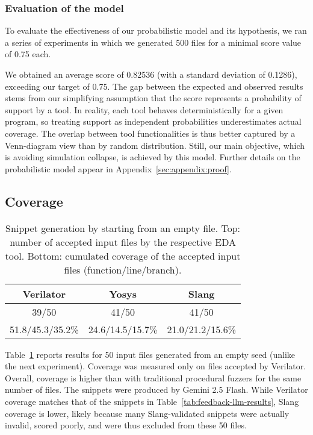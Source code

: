 \subsubsection{Evaluation of the model}
\label{sec:eval:disparities-evaluation}

To evaluate the effectiveness of our probabilistic model and its hypothesis, we ran a series of experiments in which we generated 500 files for a minimal score value of 0.75 each.

We obtained an average score of 0.82536 (with a standard deviation of 0.1286), exceeding our target of 0.75.
The gap between the expected and observed results stems from our simplifying assumption that the score represents a probability of support by a tool.
In reality, each tool behaves deterministically for a given program, so treating support as independent probabilities underestimates actual coverage.
The overlap between tool functionalities is thus better captured by a Venn-diagram view than by random distribution.
Still, our main objective, which is avoiding simulation collapse, is achieved by this model.
Further details on the probabilistic model appear in Appendix~\ref{sec:appendix:proof}.

\subsection{Coverage}
\label{sec:eval:coverage}

\begin{table}[t]
    \centering
    \caption{Snippet generation by \ourname starting from an empty file. Top: number of accepted input files by the respective EDA tool. Bottom: cumulated coverage of the accepted input files (function/line/branch).}
    \label{tab:simple-vf-cov}
    \small
    \begin{tabular}{|c|c|c|}
        \hline
        \rowcolor{gray!10} %
        \textbf{Verilator} & \textbf{Yosys}   & \textbf{Slang}   \\
        \hline
        39/50              & 41/50            & 41/50            \\
        51.8/45.3/35.2\%   & 24.6/14.5/15.7\% & 21.0/21.2/15.6\% \\
        \hline
    \end{tabular}
\end{table}

Table~\ref{tab:simple-vf-cov} reports \ourname results for 50 input files generated from an empty seed (unlike the next experiment). Coverage was measured only on files accepted by Verilator.
Overall, coverage is higher than with traditional procedural fuzzers for the same number of files.
The snippets were produced by Gemini 2.5 Flash.
While Verilator coverage matches that of the snippets in Table~\ref{tab:feedback-llm-results}, Slang coverage is lower, likely because many Slang-validated snippets were actually invalid, scored poorly, and were thus excluded from these 50 files.

